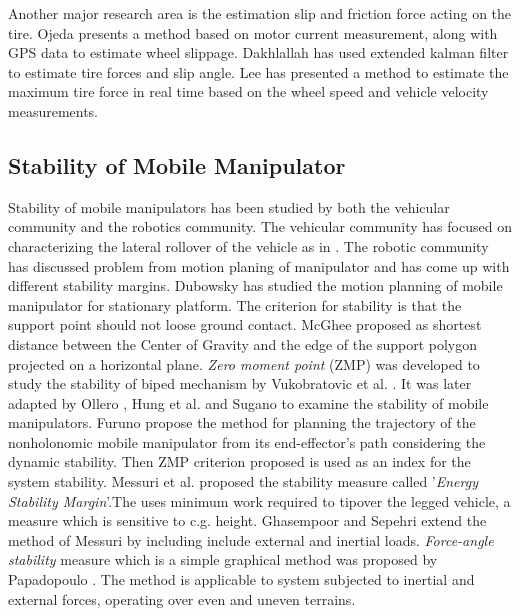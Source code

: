   
   Another major research area is the estimation slip and friction force acting on the tire. Ojeda \cite{ojeda2006current} presents a method based on motor current measurement, along with GPS data to estimate wheel slippage. Dakhlallah \cite{dakhlallah2008tire} has used extended kalman filter to estimate tire forces and slip angle. Lee \cite{lee2004real} has presented a method to estimate the maximum tire force in real time based on the wheel speed and vehicle velocity measurements.

\subsection{Stability of Mobile Manipulator}
Stability of mobile manipulators has been studied by both the vehicular community and the robotics community. The vehicular community has focused on characterizing the lateral rollover of the vehicle as in  \cite{buchele1990computer,jones1990engineering}. The robotic community has discussed problem from motion planing of manipulator and has come up with different stability margins. Dubowsky \cite{dubowsky1989planning} has studied the motion planning of mobile manipulator for stationary platform. The criterion for stability is that the support point should not loose ground contact. McGhee \cite{mcghee1968stability} proposed as shortest distance between the Center of Gravity  and the edge of the support polygon projected on a horizontal plane. \textit{Zero moment point} (ZMP) was developed to study the stability of biped mechanism by  Vukobratovic et al. \cite{vukobratovic1969contribution,vukobratovic2012biped}. It was later adapted by Ollero \cite{ollero1995stability} , Hung et al. \cite{huang1995manipulator,huang1994stability}  and Sugano \cite{sugano1993stability} to examine the stability of mobile manipulators. Furuno \cite{furuno2003trajectory} propose the method for planning the trajectory of the nonholonomic mobile manipulator from its end-effector's path  considering the dynamic stability. Then ZMP criterion proposed is used as an index for the system stability. Messuri et al. \cite{messuri1985automatic} proposed the stability measure called '\textit{Energy Stability Margin}'.The uses  minimum work required to tipover the legged vehicle, a measure which is sensitive to c.g. height. Ghasempoor and Sepehri \cite{ghasempoor1995measure}  extend the method of Messuri by including include external and inertial loads.   \textit{ Force-angle stability} measure which is a simple graphical method was proposed by Papadopoulo \cite{papadopoulos1996new,papadopoulos2000force}. The method is applicable to system subjected to inertial and external forces, operating over even and uneven terrains. 
